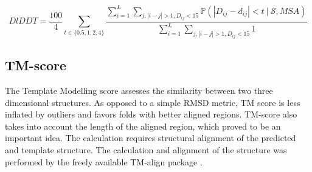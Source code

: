 \begin{equation}
DlDDT = \frac{100}{4} \sum_{t \in \{0.5, 1, 2, 4\}} \frac
{\sum_{i = 1}^L \sum_{j, |i - j| > 1, D_{ij} < 15} \mathds{P}(|D_{ij} - d_{ij}| < t~|~ \mathcal{S}, MSA)}
{\sum_{i = 1}^L \sum_{j, |i - j| > 1, D_{ij} < 15} 1}
    \label{eq:dlddt}
\end{equation}

\subsection{TM-score}

The Template Modelling score assesses the similarity between two three dimensional structures. As opposed to a simple RMSD metric, TM score is less inflated by outliers and favors folds with better aligned regions. TM-score also takes into account the length of the aligned region, which proved to be an important idea. The calculation requires structural alignment of the predicted and template structure\cite{tmscore}. The calculation and alignment of the structure was performed by the freely available TM-align package \cite{tmalign}.


